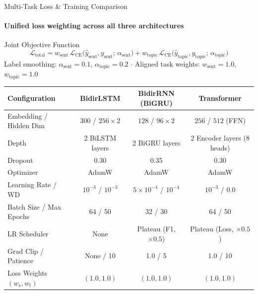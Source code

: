 \documentclass[aspectratio=169,10pt]{beamer}
\begin{document}
\begin{frame}{Multi-Task Loss \& Training Comparison}
  \framesubtitle{Unified loss weighting across all three architectures}
  \begin{block}{Joint Objective Function}
    \vspace{0.15em}
    \[
      \mathcal{L}_{\text{total}} = w_{\text{sent}}\,\mathcal{L}_{\text{CE}}\big(\hat{y}_{\text{sent}}, y_{\text{sent}};\, \alpha_{\text{sent}}\big)
      + w_{\text{topic}}\,\mathcal{L}_{\text{CE}}\big(\hat{y}_{\text{topic}}, y_{\text{topic}};\, \alpha_{\text{topic}}\big)
    \]
    \centering\scriptsize
    Label smoothing: $\alpha_{\text{sent}} = 0.1$, $\alpha_{\text{topic}} = 0.2$ \quad$\cdot$\quad
    Aligned task weights: $w_{\text{sent}} = 1.0$, $w_{\text{topic}} = 1.0$
  \end{block}

  \vspace{0.35cm}
  \begin{table}
    \centering
    \scriptsize
    \begin{tabular}{lccc}
      \toprule
      \textbf{Configuration} & \textbf{BidirLSTM} & \textbf{BidirRNN (BiGRU)} & \textbf{Transformer} \\
      \midrule
      Embedding / Hidden Dim & $300$ / $256 \times 2$ & $128$ / $96 \times 2$     & $256$ / $512$ (FFN) \\
      Depth                  & 2 BiLSTM layers    & 2 BiGRU layers            & 2 Encoder layers ($8$ heads) \\
      Dropout                & 0.30               & 0.35                      & 0.30 \\
      Optimizer              & AdamW              & AdamW                     & AdamW \\
      Learning Rate / WD     & $10^{-3}$ / $10^{-3}$ & $5\times10^{-4}$ / $10^{-4}$ & $10^{-3}$ / $0.0$ \\
      Batch Size / Max Epochs & 64 / 50           & 32 / 30                   & 64 / 50 \\
      LR Scheduler           & None               & Plateau (F1, $\times 0.5$) & Plateau (Loss, $\times 0.5$) \\
      Grad Clip / Patience   & None / 10          & 1.0 / 5                   & 1.0 / 10 \\
      Loss Weights $(w_s, w_t)$ & $(1.0, 1.0)$    & $(1.0, 1.0)$              & $(1.0, 1.0)$ \\
      \bottomrule
    \end{tabular}
  \end{table}
\end{frame}
\end{document}

